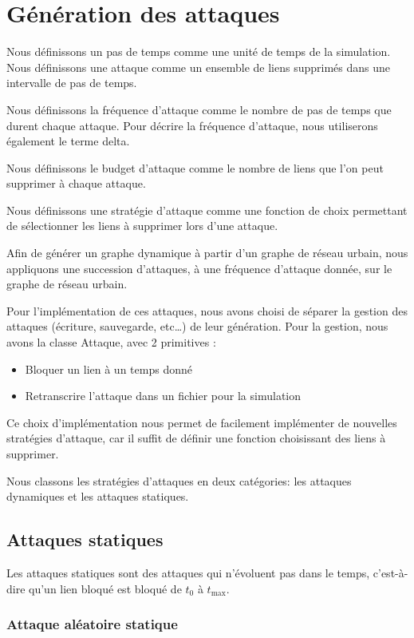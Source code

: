 \section{Génération des attaques}\label{sec:attaques}

Nous définissons un pas de temps comme une unité de temps de la simulation. 
Nous définissons une attaque comme un ensemble de liens supprimés dans une 
intervalle de pas de temps.

Nous définissons la fréquence d'attaque comme le nombre de pas de temps
que durent chaque attaque. Pour décrire la fréquence d'attaque, nous utiliserons 
également le terme delta. 

Nous définissons le budget d'attaque comme le nombre de liens que l'on peut
supprimer à chaque attaque. 

Nous définissons une stratégie d'attaque comme une fonction de choix permettant 
de sélectionner les liens à supprimer lors d'une attaque.

Afin de générer un graphe dynamique à partir d'un graphe de réseau urbain, nous appliquons 
une succession d'attaques, à une fréquence d'attaque donnée, sur le graphe de réseau urbain.

Pour l'implémentation de ces attaques, nous avons choisi de séparer la gestion des attaques (écriture, 
sauvegarde, etc\dots) de leur génération. 
Pour la gestion, nous avons la classe Attaque, avec 2 primitives :
\begin{itemize}
\item Bloquer un lien à un temps donné
\item Retranscrire l'attaque dans un fichier pour la simulation
\end{itemize}

Ce choix d'implémentation nous permet de facilement implémenter de nouvelles stratégies d'attaque, car il 
suffit de définir une fonction choisissant des liens à supprimer. 

Nous classons les stratégies d'attaques en deux catégories: les attaques dynamiques et les attaques statiques.
\subsection{Attaques statiques}\label{subsec:attaques_statiques}

Les attaques statiques sont des attaques qui n'évoluent pas dans le temps, c'est-à-dire qu'un lien bloqué est bloqué de ${t_{0}}$ à ${t_{\max}}$.

\subsubsection{Attaque aléatoire statique}\label{subsubsec:attaque_aleatoire_statique}

